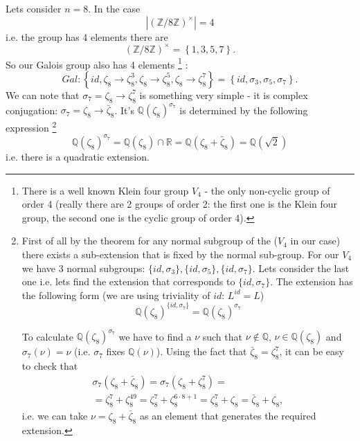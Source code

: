 \begin{example}[$n=8$]
  Lets consider $n = 8$. In the case
  \[
  \left|\left(\mathbb{Z}/8\mathbb{Z}\right)^\times\right| = 4
  \]
  i.e. the group has 4 elements there are
  \[
  \left(\mathbb{Z}/8\mathbb{Z}\right)^\times =
  \left\{
  1,3,5,7
  \right\}.
  \]
  So our Galois group also has 4 elements
  \footnote{
    There is a well known Klein four group $V_4$ \cite{wiki:klein4group} -
    the only non-cyclic group of order 4 (really there are 2 groups of
    order 2: the first one is the Klein four group, the second one is
    the cyclic group of order 4). 
  }
  :
  \[
  Gal: \left\{
  id, \zeta_8 \to \zeta_8^3,
  \zeta_8 \to \zeta_8^5, \zeta_8 \to \zeta_8^7
  \right\} =
  \left\{
  id, \sigma_3, \sigma_5, \sigma_7
  \right\}.
  \]
  We can note that $\sigma_7 = \zeta_8 \to \zeta_8^7$ is something
  very simple - it is complex conjugation:
  $\sigma_7 = \zeta_8 \to \bar{\zeta}_8$. It's
   $\mathbb{Q}\left(\zeta_8\right)^{\sigma_7}$
  is determined by the following expression
  \footnote{
    First of all by the  theorem for
    any normal subgroup of the  ($V_4$ in our
    case) there exists a sub-extension that is fixed by the normal
    sub-group. For our $V_4$ we have 3 normal subgroups:
    $\{id, \sigma_3\}, \{id, \sigma_5\}, \{id, \sigma_7\}$. Lets
    consider the last one i.e. lets find the extension that corresponds
    to $\{id, \sigma_7\}$. The extension has the following form (we
    are using triviality of $id$: $L^{id} = L$)
    \[
    \mathbb{Q}\left(\zeta_8\right)^{\{id, \sigma_7\}} =
    \mathbb{Q}\left(\zeta_8\right)^{\sigma_7}
    \]

    To calculate $\mathbb{Q}\left(\zeta_8\right)^{\sigma_7}$ we have
    to find a  $\nu$ such
    that $\nu \notin \mathbb{Q}$, $\nu \in
    \mathbb{Q}\left(\zeta_8\right)$ and $\sigma_7\left(\nu\right) =
    \nu$ (i.e. $\sigma_7$ fixes $\mathbb{Q}\left(\nu\right)$).
    Using the fact that $\bar{\zeta}_8 = \zeta_8^7$, it can
    be easy to check that
    \begin{eqnarray}
      \sigma_7\left(\zeta_8 + \bar{\zeta}_8\right) =
      \sigma_7\left(\zeta_8 + \zeta_8^7\right) =
      \nonumber \\
      =
      \zeta_8^7 + \zeta_8^{49} =
      \zeta_8^7 + \zeta_8^{6 \cdot 8 + 1} =
      \zeta_8^7 + \zeta_8 = \bar{\zeta}_8 + \zeta_8,
      \nonumber
    \end{eqnarray}
    i.e. we can take $\nu = \zeta_8 + \bar{\zeta}_8$ as an element
    that generates the required extension.
  }
  \[
  \mathbb{Q}\left(\zeta_8\right)^{\sigma_7} =
  \mathbb{Q}\left(\zeta_8\right) \cap \mathbb{R} =
  \mathbb{Q}\left(\zeta_8 + \bar{\zeta}_8\right) =
  \mathbb{Q}\left(\sqrt{2}\right)
  \]
  i.e. there is a quadratic extension.


\end{example}
